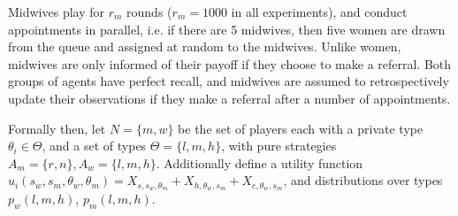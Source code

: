 Midwives play for \(r_{m}\) rounds (\(r_{m}=1000\) in all experiments), and conduct appointments in parallel, i.e. if there are 5 midwives, then five women are drawn from the queue and assigned at random to the midwives. 
Unlike women, midwives are only informed of their payoff if they choose to make a referral. Both groups of agents have perfect recall, and midwives are assumed to retrospectively update their observations if they make a referral after a number of appointments.


Formally then, let \(N = \{m, w\}\) be the set of players each with a private type \(\theta_{i} \in \Theta\), and a set of types \(\Theta=\{l, m, h\}\), with pure strategies \(A_{m}=\{r,n\}, A_{w}=\{l, m, h\}\). Additionally define a utility function \(u_{i}(s_{w}, s_{m}, \theta_{w}, \theta_{m})=X_{s, s_{w}, \theta_{m}} + X_{h, \theta_{w}, s_{m}} + X_{c, \theta_{w}, s_{m}}\), and distributions over types \(p_{w}(l, m, h)\), \(p_{m}(l, m, h)\).

\begin{table}
\center
{}



\caption{Payoff matrices\label{tab:Payoff-matrix}}
\end{table}

